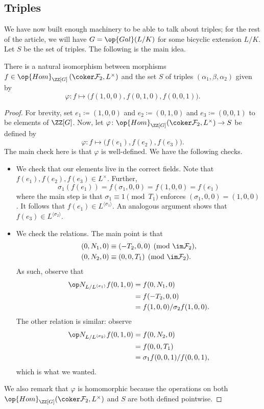 \documentclass{article}
\begin{document}
\subsection{Triples}
We have now built enough machinery to be able to talk about triples; for the rest of the article, we will have $G=\op{Gal}(L/K)$ for some bicyclic extension $L/K$. Let $S$ be the set of triples. The following is the main idea.
\begin{lemma} \label{lem:tripleisomorphism}
	There is a natural isomorphism between morphisms $f\in\op{Hom}_{\ZZ[G]}\left(\coker\mathcal F_2,L^\times\right)$ and the set $S$ of triples $(\alpha_1,\beta,\alpha_2)$ given by
	\[\varphi\colon f\mapsto\big(f(1,0,0),f(0,1,0),f(0,0,1)\big).\]
\end{lemma}
\begin{proof}
	For brevity, set $e_1\coloneqq(1,0,0)$ and $e_2\coloneqq(0,1,0)$ and $e_3\coloneqq(0,0,1)$ to be elements of $\ZZ[G]$. Now, let $\varphi\colon\op{Hom}_{\ZZ[G]}(\coker\mathcal F_2,L^\times)\to S$ be defined by
	\[\varphi\colon f\mapsto\big(f(e_1),f(e_2),f(e_3)\big).\]
	The main check here is that $\varphi$ is well-defined. We have the following checks.
	\begin{itemize}
		\item We check that our elements live in the correct fields. Note that $f(e_1),f(e_2),f(e_3)\in L^\times$. Further,
		\[\sigma_1(f(e_1))=f(\sigma_1,0,0)=f(1,0,0)=f(e_1)\]
		where the main step is that $\sigma_1\equiv1\pmod{T_1}$ enforces $(\sigma_1,0,0)=(1,0,0)$. It follows that $f(e_1)\in L^{\langle\sigma_1\rangle}$. An analogous argument shows that $f(e_3)\in L^{\langle\sigma_2\rangle}$.
		\item We check the relations. The main point is that
		\begin{align*}
			(0,N_1,0) &\equiv (-T_2,0,0) \pmod{\im\mathcal F_2}, \\
			(0,N_2,0) &\equiv (0,0,T_1) \pmod{\im\mathcal F_2}.
		\end{align*}
		As such, observe that
		\begin{align*}
			\op N_{L/L^{\langle\sigma_1\rangle}}f(0,1,0) &= f(0,N_1,0) \\
			&= f(-T_2,0,0) \\
			&= f(1,0,0)/\sigma_2f(1,0,0).
		\end{align*}
		The other relation is similar: observe
		\begin{align*}
			\op N_{L/L^{\langle\sigma_2\rangle}}f(0,1,0) &= f(0,N_2,0) \\
			&= f(0,0,T_1) \\
			&= \sigma_1f(0,0,1)/f(0,0,1),
		\end{align*}
		which is what we wanted.
	\end{itemize}
	We also remark that $\varphi$ is homomorphic because the operations on both $\op{Hom}_{\ZZ[G]}(\coker\mathcal F_2,L^\times)$ and $S$ are both defined pointwise.


\end{proof}
\end{document}
